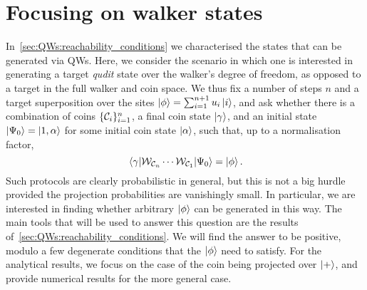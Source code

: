 

\section{Focusing on walker states}
\label{sec:QWs:focusing_walker_states}

In~\cref{sec:QWs:reachability_conditions} we characterised the states that can be generated via \acp{QW}.
Here, we consider the scenario in which one is interested in generating a target \emph{qudit} state over the walker's degree of freedom, as opposed to a target in the full walker and coin space.
We thus fix a number of steps $n$ and a target superposition over the sites $\ket\phi=\sum_{i=1}^{n+1} u_i\ket i$, and ask whether there is a combination of coins $\{{\mathcal{C}}_i\}_{i=1}^{n}$, a final coin state $\ket\gamma$, and an initial state $\ket{\Psi_0}=\ket{1, \alpha}$ for some initial coin state $\ket\alpha$, such that, up to a normalisation factor,
\begin{equation}
    \mel{\gamma}{{\mathcal{W}}_{{\mathcal{C}}_{n}} \cdots{\mathcal{W}}_{{\mathcal{C}}_{1}}}{\Psi_0} = \ket\phi.
\end{equation}
Such protocols are clearly probabilistic in general, but this is not a big hurdle provided the projection probabilities are vanishingly small.
In particular, we are interested in finding whether arbitrary $\ket\phi$ can be generated in this way.
The main tools that will be used to answer this question are the results of~\cref{sec:QWs:reachability_conditions}.
We will find the answer to be positive, modulo a few degenerate conditions that the $\ket\phi$ need to satisfy.
For the analytical results, we focus on the case of the coin being projected over $\ket+$,
and provide numerical results for the more general case.

